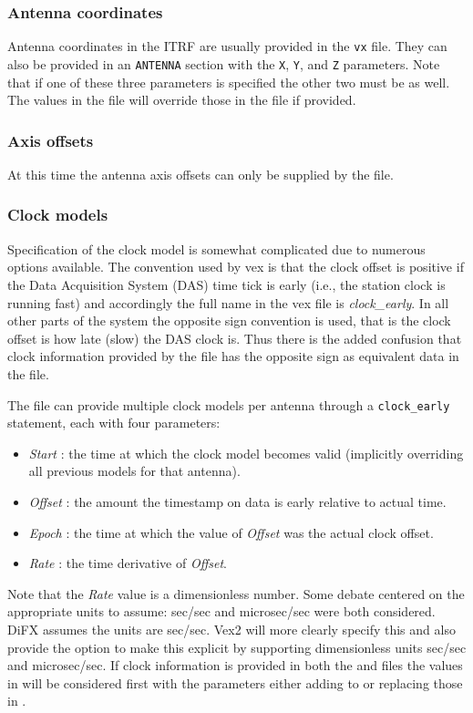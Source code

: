 \documentclass[12pt]{article}
\begin{document}
\subsubsection{Antenna coordinates}

Antenna coordinates in the ITRF are usually provided in the {\tt vx} file.
They can also be provided in an {\tt ANTENNA} section with the {\tt X}, {\tt Y}, and {\tt Z} parameters.
Note that if one of these three parameters is specified the other two must be as well.
The values in the \vd file will override those in the \vx file if provided.


\subsubsection{Axis offsets}

At this time the antenna axis offsets can only be supplied by the \vx file.

\subsubsection{Clock models}

Specification of the clock model is somewhat complicated due to numerous options available.
The convention used by vex is that the clock offset is positive if the Data Acquisition System (DAS) time tick is early (i.e., the station clock is running fast) and accordingly the full name in the vex file is {\em clock\_early}.
In all other parts of the system the opposite sign convention is used, that is the clock offset is how late (slow) the DAS clock is.
Thus there is the added confusion that clock information provided by the \vd file has the opposite sign as equivalent data in the \vx file.

The \vx file can provide multiple clock models per antenna through a {\tt clock\_early} statement, each with four parameters:
\begin{itemize}
\item {\em Start} : the time at which the clock model becomes valid (implicitly overriding all previous models for that antenna).
\item {\em Offset} : the amount the timestamp on data is early relative to actual time.
\item {\em Epoch} : the time at which the value of {\em Offset} was the actual clock offset.
\item {\em Rate} : the time derivative of {\em Offset}.
\end{itemize}
Note that the {\em Rate} value is a dimensionless number.
Some debate centered on the appropriate units to assume: sec/sec and microsec/sec were both considered.
DiFX assumes the units are sec/sec.
Vex2 will more clearly specify this and also provide the option to make this explicit by supporting dimensionless units sec/sec and microsec/sec.
If clock information is provided in both the \vx and \vd files the values in \vx will be considered first with the \vd parameters either adding to or replacing those in \vx.
\end{document}
